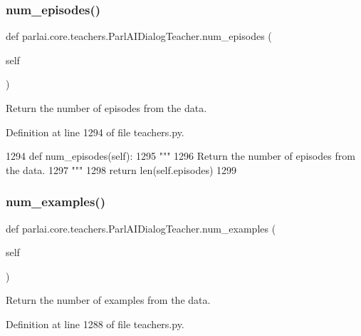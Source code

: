 \subsubsection{\texorpdfstring{num\+\_\+episodes()}{num\_episodes()}}
{\footnotesize\ttfamily def parlai.\+core.\+teachers.\+Parl\+A\+I\+Dialog\+Teacher.\+num\+\_\+episodes (\begin{DoxyParamCaption}\item[{}]{self }\end{DoxyParamCaption})}

\begin{DoxyVerb}Return the number of episodes from the data.
\end{DoxyVerb}
 

Definition at line 1294 of file teachers.\+py.


\begin{DoxyCode}
1294     \textcolor{keyword}{def }num\_episodes(self):
1295         \textcolor{stringliteral}{"""}
1296 \textcolor{stringliteral}{        Return the number of episodes from the data.}
1297 \textcolor{stringliteral}{        """}
1298         \textcolor{keywordflow}{return} len(self.episodes)
1299 
\end{DoxyCode}
\mbox{\label{classparlai_1_1core_1_1teachers_1_1ParlAIDialogTeacher_a37c1c62c52860da9c63d9f6ed23ae6ae}} 
\subsubsection{\texorpdfstring{num\+\_\+examples()}{num\_examples()}}
{\footnotesize\ttfamily def parlai.\+core.\+teachers.\+Parl\+A\+I\+Dialog\+Teacher.\+num\+\_\+examples (\begin{DoxyParamCaption}\item[{}]{self }\end{DoxyParamCaption})}

\begin{DoxyVerb}Return the number of examples from the data.
\end{DoxyVerb}
 

Definition at line 1288 of file teachers.\+py.


